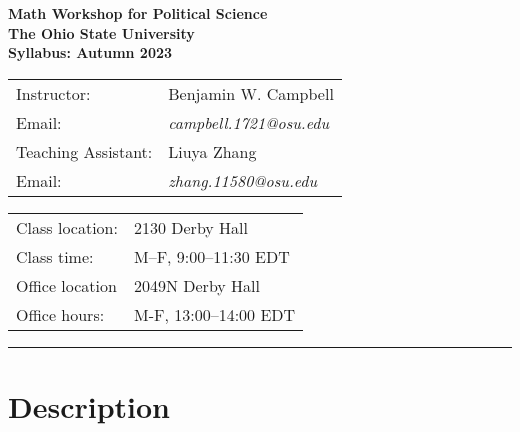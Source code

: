 \documentclass[12pt]{article}
\newcommand{\flexrule}[2]{
  \begin{center}
    \rule{#1\textwidth}{#2}
  \end{center}
}
\begin{document}
\normalem


\thispagestyle{empty}
\begin{center}
  {\huge\bfseries Math Workshop for Political Science} \\[0.5em]
  {\LARGE\bfseries The Ohio State University} \\[0.5em]
  {\large\bfseries Syllabus: Autumn 2023} \\

  \vspace{2.5em}

  \begin{minipage}{0.4\linewidth} \flushleft
    \begin{tabular}{ll}
      Instructor:         & Benjamin W. Campbell \\
      Email:              & \emph{campbell.1721}\emph{\small @}\emph{osu.edu} \\[1.0em]
      Teaching Assistant: & Liuya Zhang \\
      Email:              & \emph{zhang.11580}\emph{\small @}\emph{osu.edu}
    \end{tabular}
  \end{minipage}
  \hspace{0.14\linewidth}
  \begin{minipage}{0.44\linewidth} \flushleft
    \begin{tabular}{ll}
      Class location: & 2130 Derby Hall \\
      Class time:     & M--F, 9:00--11:30 EDT \\[1.0em]
      Office location & 2049N Derby Hall \\
      Office hours:   & M-F, 13:00--14:00 EDT
    \end{tabular}
  \end{minipage}
\end{center}

\vspace{0.5em}


\flexrule{1.0}{0.5pt}

\section*{Description}
\end{document}
